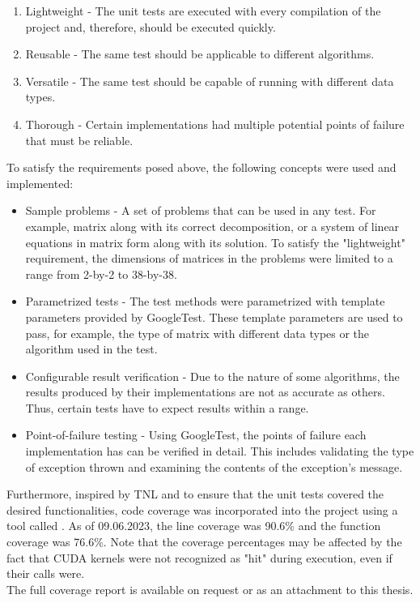 \begin{enumerate}
	\item Lightweight - The unit tests are executed with every compilation of the project and, therefore, should be executed quickly.
	\item Reusable - The same test should be applicable to different algorithms.
	\item Versatile - The same test should be capable of running with different data types.
	\item Thorough - Certain implementations had multiple potential points of failure that must be reliable.
\end{enumerate}

To satisfy the requirements posed above, the following concepts were used and implemented:

\begin{itemize}
	\item Sample problems - A set of problems that can be used in any test. For example, matrix  along with its correct decomposition, or a system of linear equations in matrix form along with its solution. To satisfy the "lightweight" requirement, the dimensions of matrices in the problems were limited to a range from 2-by-2 to 38-by-38.
	\item Parametrized tests - The test methods were parametrized with template parameters provided by GoogleTest. These template parameters are used to pass, for example, the type of matrix with different data types or the algorithm used in the test.
	\item Configurable result verification - Due to the nature of some algorithms, the results produced by their implementations are not as accurate as others. Thus, certain tests have to expect results within a range.
	\item Point-of-failure testing - Using GoogleTest, the points of failure each implementation has can be verified in detail. This includes validating the type of exception thrown and examining the contents of the exception's message.
\end{itemize}

Furthermore, inspired by TNL and to ensure that the unit tests covered the desired functionalities, code coverage was incorporated into the project using a tool called  \cite{Cox2023}. As of 09.06.2023, the line coverage was 90.6\% and the function coverage was 76.6\%. Note that the coverage percentages may be affected by the fact that CUDA kernels were not recognized as "hit" during execution, even if their calls were.\\
The full coverage report is available on request or as an attachment to this thesis.



